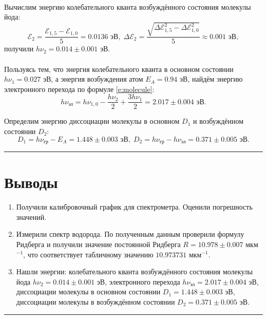 \documentclass[a4paper,12pt]{article} %
\begin{document}
\paragraph{} Вычислим энергию колебательного кванта возбуждённого состояния молекулы йода:
\[
\mathcal{E}_2 = \frac{\mathcal{E}_{1, 5} - \mathcal{E}_{1, 0}}{5} = 0.0136 \text{ эВ}, \; \Delta\mathcal{E}_2 = \frac{\sqrt{\Delta\mathcal{E}_{1, 5}^2 - \Delta\mathcal{E}_{1, 0}^2}}{5} \approx 0.001 \text{ эВ},
\]
\noindent получили $h \nu_2 = 0.014 \pm 0.001$ эВ.

\paragraph{} Пользуясь тем, что энергия колебательного кванта в основном состоянии $h \nu_1 = 0.027$ эВ, а энергия возбуждения атом $E_A = 0.94$ эВ, найдём энергию электронного перехода по формуле \eqref{e:molecule}:
\[
h \nu_\text{эл} = h \nu_{1, 0} - \frac{h \nu_2}{2} + \frac{3h \nu_1}{2} = 2.017 \pm 0.004 \text{ эВ}.
\]

Определим энергию диссоциации молекулы в основном $D_1$ и возбуждённом состоянии $D_2$:
\[
D_1 = h \nu_\text{гр} - E_A = 1.448 \pm 0.003 \text{ эВ}, \; D_2 = h \nu_\text{гр} - h \nu_\text{эл} = 0.371 \pm 0.005 \text{ эВ}.
\]

\medskip\hrule\medskip

\section{Выводы}

\begin{enumerate}
\item Получили калибровочный график для спектрометра. Оценили погрешность значений.
\item Измерили спектр водорода. По полученным данным проверили формулу Ридберга и получили значение постоянной Ридберга $R = 10.978 \pm 0.007$ мкм$^{-1}$, что соответствует табличному значению $10. 973731$ мкм$^{-1}$.
\item Нашли энергии: колебательного кванта возбуждённого состояния молекулы йода $h \nu_2 = 0.014 \pm 0.001$ эВ, электронного перехода $h \nu_\text{эл} = 2.017 \pm 0.004 \text{ эВ}$, диссоциации молекулы в основном состоянии $D_1 = 1.448 \pm 0.003 \text{ эВ}$, диссоциации молекулы в возбуждённом состоянии $D_2 =  0.371 \pm 0.005 \text{ эВ}$.
\end{enumerate}

\medskip\hrule\medskip
\end{document}
